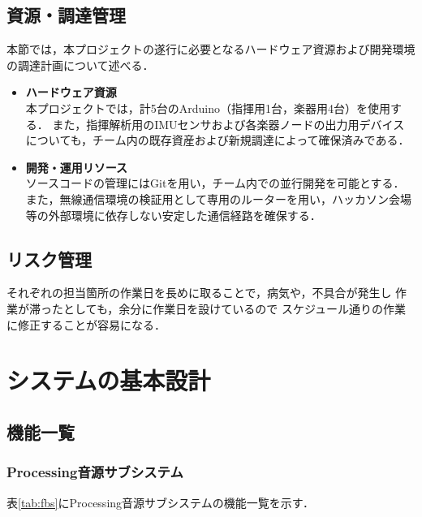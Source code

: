 \documentclass[lualatex,book,paper=a4paper,jafontsize=11.5pt,jafontscale=1.05]{jlreq}
\begin{document}
\section{資源・調達管理}
本節では，本プロジェクトの遂行に必要となるハードウェア資源および開発環境の調達計画について述べる．
\begin{itemize}
 \item{\textbf{ハードウェア資源}}\\
 本プロジェクトでは，計5台のArduino（指揮用1台，楽器用4台）を使用する．
 また，指揮解析用のIMUセンサおよび各楽器ノードの出力用デバイスについても，チーム内の既存資産および新規調達によって確保済みである．
 \item{\textbf{開発・運用リソース}}\\
 ソースコードの管理にはGitを用い，チーム内での並行開発を可能とする．
 また，無線通信環境の検証用として専用のルーターを用い，ハッカソン会場等の外部環境に依存しない安定した通信経路を確保する．
 
\end{itemize}


\section{リスク管理}
それぞれの担当箇所の作業日を長めに取ることで，病気や，不具合が発生し
作業が滞ったとしても，余分に作業日を設けているので
スケジュール通りの作業に修正することが容易になる．

\chapter{システムの基本設計}



\section{機能一覧}
\subsection{Processing音源サブシステム}
表\ref{tab:fbs}にProcessing音源サブシステムの機能一覧を示す．
\end{document}
